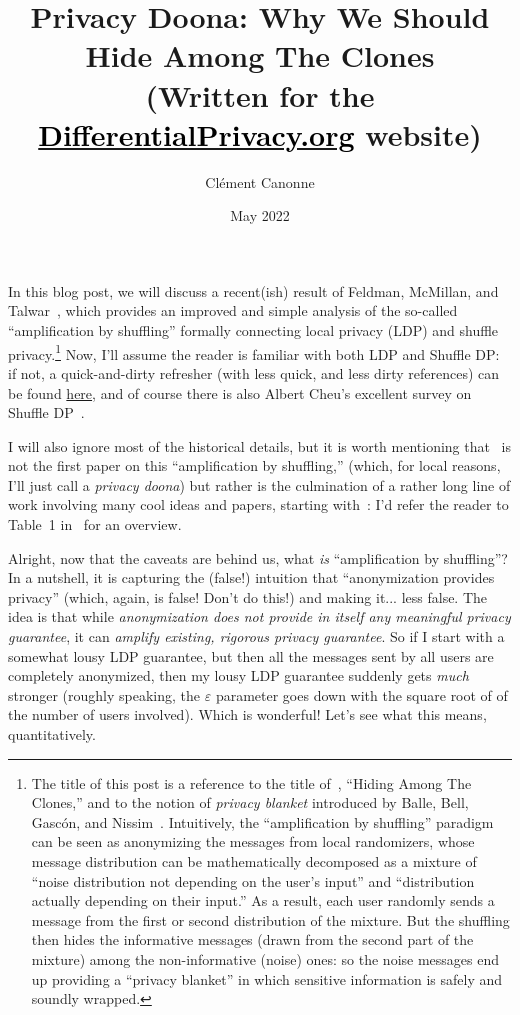 \documentclass[11pt]{article}
\title{Privacy Doona: Why We Should Hide Among The Clones\\[.5em]\small{}(Written for the \href{https://differentialprivacy.org}{\textcolor{black}{DifferentialPrivacy.org}} website)}
\author{Cl\'ement Canonne}
\date{May 2022}
\begin{document}
\maketitle

In this blog post, we will discuss a recent(ish) result of Feldman, McMillan, and Talwar~\cite{FeldmanMT21}, which provides an improved and simple analysis of the so-called ``amplification by shuffling'' formally connecting local privacy (LDP) and shuffle privacy.\footnote{The title of this post is a reference to the title of~\cite{FeldmanMT21}, ``Hiding Among The Clones,'' and to the notion of \emph{privacy blanket} introduced by Balle, Bell, Gasc\'{o}n, and Nissim~\cite{BalleBGN19}. Intuitively, the ``amplification by shuffling'' paradigm can be seen as anonymizing the messages from local randomizers, whose message distribution can be mathematically decomposed as a mixture of ``noise distribution not depending on the user's input'' and ``distribution actually depending on their input.'' As a result, each user randomly sends a message from the first or second distribution of the mixture.  But the shuffling then hides the informative messages (drawn from the second part of the mixture) among the non-informative (noise) ones: so the noise messages end up providing a ``privacy blanket'' in which sensitive information is safely and soundly wrapped.} Now, I'll assume the reader is familiar with both LDP and Shuffle DP: if not, a quick-and-dirty refresher (with less quick, and less dirty references) can be found \href{https://differentialprivacy.org/trustmodels/}{here}, and of course there is also Albert Cheu's excellent survey on Shuffle DP~\cite{Cheu21}.

I will also ignore most of the historical details, but it is worth mentioning that~\cite{FeldmanMT21} is not the first paper on this ``amplification by shuffling,'' (which, for local reasons, I'll just call a \emph{privacy doona}) but rather is the culmination of a rather long line of work involving many cool ideas and papers, starting with~\cite{CheuSUZZ19,ErlingssonFMRTT19}: I'd refer the reader to Table~1 in~\cite{FeldmanMT21} for an overview.

Alright, now that the caveats are behind us, what \emph{is} ``amplification by shuffling''? In a nutshell, it is capturing the (false!) intuition that ``anonymization provides privacy'' (which, again, is false! Don't do this!) and making it... less false. The idea is that while \emph{anonymization does not provide in itself any meaningful privacy guarantee}, it can \emph{amplify existing, rigorous privacy guarantee}. So if I start with a somewhat lousy LDP guarantee, but then all the messages sent by all users are completely anonymized, then my lousy LDP guarantee suddenly gets \emph{much} stronger (roughly speaking, the $\varepsilon$ parameter goes down with the square root of of the number of users involved). Which is wonderful! Let's see what this means, quantitatively.
\end{document}
